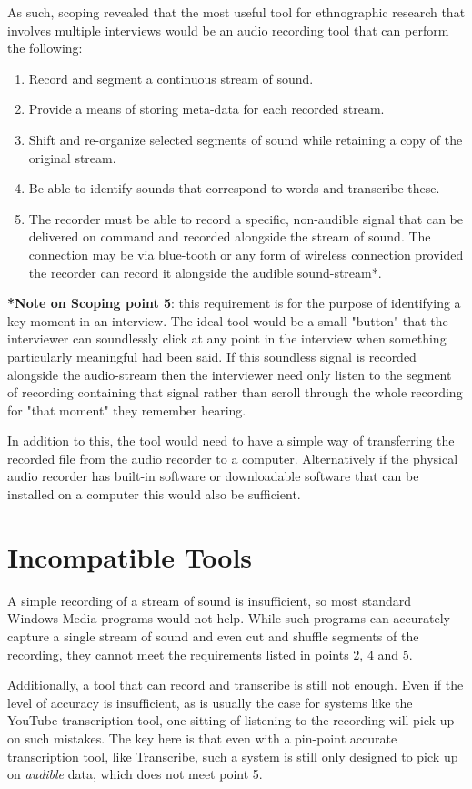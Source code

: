 \documentclass{article}
\begin{document}
As such, scoping revealed that the most useful tool for ethnographic research that involves multiple interviews would be an audio recording tool that can perform the following:
\begin{enumerate}
\item Record and segment a continuous stream of sound.
\item Provide a means of storing meta-data for each recorded stream.
\item Shift and re-organize selected segments of sound while retaining a copy of the original stream.
\item Be able to identify sounds that correspond to words and transcribe these.
\item The recorder must be able to record a specific, non-audible signal that can be delivered on command and recorded alongside the stream of sound. The connection may be via blue-tooth or any form of wireless connection provided the recorder can record it alongside the audible sound-stream*.
\end{enumerate}

\textbf{*Note on Scoping point 5}: this requirement is for the purpose of identifying a key moment in an interview. The ideal tool would be a small "button" that the interviewer can soundlessly click at any point in the interview when something particularly meaningful had been said. If this soundless signal is recorded alongside the audio-stream then the interviewer need only listen to the segment of recording containing that signal rather than scroll through the whole recording for "that moment" they remember hearing.

In addition to this, the tool would need to have a simple way of transferring the recorded file from the audio recorder to a computer. Alternatively if the physical audio recorder has built-in software or downloadable software that can be installed on a computer this would also be sufficient.

\section{Incompatible Tools}
A simple recording of a stream of sound is insufficient, so most standard Windows Media programs would not help. While such programs can accurately capture a single stream of sound and even cut and shuffle segments of the recording, they cannot meet the requirements listed in points 2, 4 and 5.

Additionally, a tool that can record and transcribe is still not enough. Even if the level of accuracy is insufficient, as is usually the case for systems like the YouTube transcription tool, one sitting of listening to the recording will pick up on such mistakes. The key here is that even with a pin-point accurate transcription tool, like Transcribe, such a system is still only designed to pick up on \textit{audible} data, which does not meet point 5.
\end{document}
